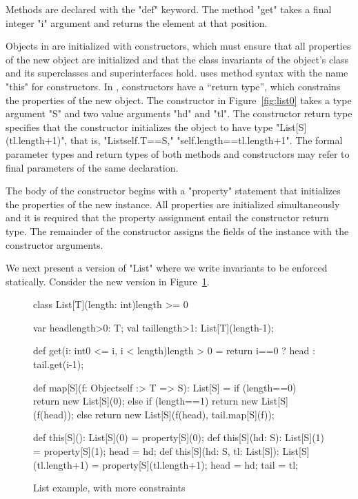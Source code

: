 Methods are declared with the \xcd"def" keyword.
The method \xcd"get" takes a final integer \xcd"i" argument
and returns the element at that position.

Objects in \Xten{} are initialized with constructors, which
must ensure that all properties of the new object
are initialized and that the class invariants of the object's
class and its superclasses and superinterfaces hold.
\Xten{} uses method syntax with the name
\xcd"this" for constructors.
In \Xten{}, constructors have a ``return type'', which constrains
the properties of the new object.  The constructor in
Figure~\ref{fig:list0} takes a type argument \xcd"S"
and two value arguments \xcd"hd" and \xcd"tl".  The constructor
return type specifies that the constructor initializes the
object to have type \xcd"List[S](tl.length+1)", that is,
\xcd"List{self.T==S," \xcd"self.length==tl.length+1}".
The formal parameter types and return types of both methods and
constructors may refer to final parameters of the same
declaration.

The body of the constructor
begins with a \xcd"property" statement that initializes the
properties of the new instance.  All properties are initialized
simultaneously and it is required that the property assignment
entail the constructor return type.
The remainder of the constructor assigns the fields of the
instance with the constructor arguments.

We next present a version of \xcd"List" where we write
invariants to be enforced statically.  Consider the new version
in Figure~\ref{fig:list}.

\begin{figure}
{\footnotesize
\begin{xtennoindent}
class List[T](length: int){length >= 0} {
  var head{length>0}: T;
  val tail{length>1}: List[T](length-1);

  def get(i: int{0 <= i, i < length}){length > 0} = {
    return i==0 ? head : tail.get(i-1);
  }

  def map[S](f: Object{self :> T} => S): List[S] = {
    if (length==0)
      return new List[S](0);
    else if (length==1)
      return new List[S](f(head));
    else
      return new List[S](f(head), tail.map[S](f));
  }

  def this[S](): List[S](0) = property[S](0);
  def this[S](hd: S): List[S](1) = {
    property[S](1); head = hd;
  }
  def this[S](hd: S, tl: List[S]): List[S](tl.length+1) = {
    property[S](tl.length+1);
    head = hd; tail = tl;
  }
}
\end{xtennoindent}}
\caption{List example, with more constraints}
\label{fig:list}
\end{figure}

